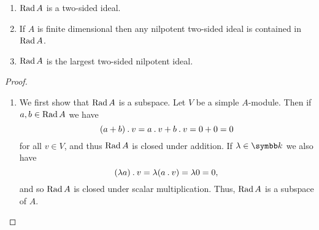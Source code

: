 \begin{prp}{}{}
    \begin{enumerate}
        \item \(\operatorname{Rad} A\) is a two-sided ideal.
        \item If \(A\) is finite dimensional then any nilpotent two-sided ideal is contained in \(\operatorname{Rad} A\).
        \item \(\operatorname{Rad} A\) is the largest two-sided nilpotent ideal.
    \end{enumerate}
    \begin{proof}
        \begin{enumerate}
            \item We first show that \(\operatorname{Rad} A\) is a subspace.
            Let \(V\) be a simple \(A\)-module.
            Then if \(a, b \in \operatorname{Rad} A\) we have 
            \begin{equation}
                (a + b) \mathbin{.} v = a \mathbin{.} v + b \mathbin{.} v = 0 + 0 = 0
            \end{equation}
            for all \(v \in V\), and thus \(\operatorname{Rad} A\) is closed under addition.
            If \(\lambda \in \field\) we also have
            \begin{equation}
                (\lambda a) \mathbin{.} v = \lambda(a \mathbin{.} v) = \lambda 0 = 0,
            \end{equation}
            and so \(\operatorname{Rad} A\) is closed under scalar multiplication.
            Thus, \(\operatorname{Rad} A\) is a subspace of \(A\).
            

\end{enumerate}
\end{proof}
\end{prp}
